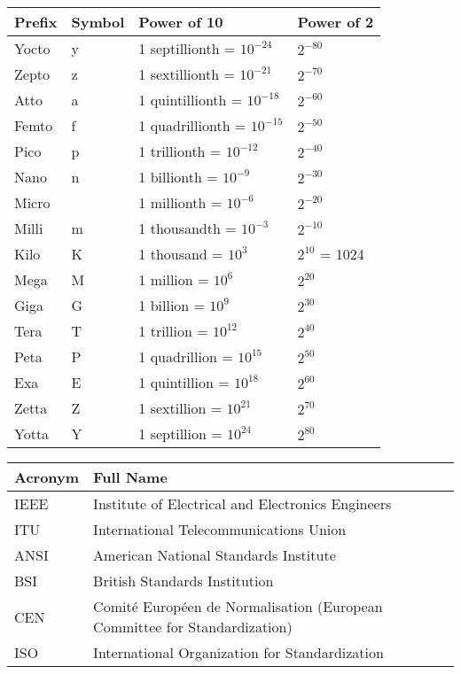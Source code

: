 




\begin{NxLightBox}[title={Common Numerical Prefixes Used for Computers}]
	\begin{tabularx}{\textwidth}{|X|l|X|X|}
		\hline
		Prefix & Symbol &  Power of 10 & Power of 2 \\
		\hline
		Yocto & y & 1 septillionth = $10^{-24}$ & $2^{-80}$ \\
		Zepto & z & 1 sextillionth = $10^{-21}$ & $2^{-70}$ \\
		Atto & a & 1 quintillionth = $10^{-18}$ & $2^{-60}$ \\
		Femto & f & 1 quadrillionth = $10^{-15}$ & $2^{-50}$ \\
		Pico & p & 1 trillionth = $10^{-12}$ & $2^{-40}$ \\
		Nano & n & 1 billionth = $10^{-9}$ & $2^{-30}$ \\
		Micro & \textmu & 1 millionth = $10^{-6}$ & $2^{-20}$ \\
		Milli & m & 1 thousandth = $10^{-3}$ & $2^{-10}$ \\
		Kilo & K & 1 thousand = $10^3$ & $2^{10}$ = 1024 \\
		Mega & M & 1 million = $10^6$ & $2^{20}$ \\
		Giga & G & 1 billion = $10^9$ & $2^{30}$ \\
		Tera & T & 1 trillion = $10^{12}$ & $2^{40}$ \\
		Peta & P & 1 quadrillion = $10^{15}$ & $2^{50}$ \\
		Exa & E & 1 quintillion = $10^{18}$ & $2^{60}$ \\
		Zetta & Z & 1 sextillion = $10^{21}$ & $2^{70}$ \\
		Yotta & Y & 1 septillion = $10^{24}$ & $2^{80}$ \\
		\hline
	\end{tabularx}
\end{NxLightBox}



\begin{NxLightBox}[title={International Standards Bodies}]
	\begin{tabularx}{\textwidth}{|l|X|}
		\toprule
		Acronym & Full Name \\
		\midrule
		IEEE & Institute of Electrical and Electronics Engineers \\
		ITU & International Telecommunications Union \\
		ANSI & American National Standards Institute \\
		BSI & British Standards Institution \\
		CEN & Comité Européen de Normalisation (European Committee for Standardization) \\
		ISO & International Organization for Standardization \\
		\bottomrule
	\end{tabularx}
\end{NxLightBox}

